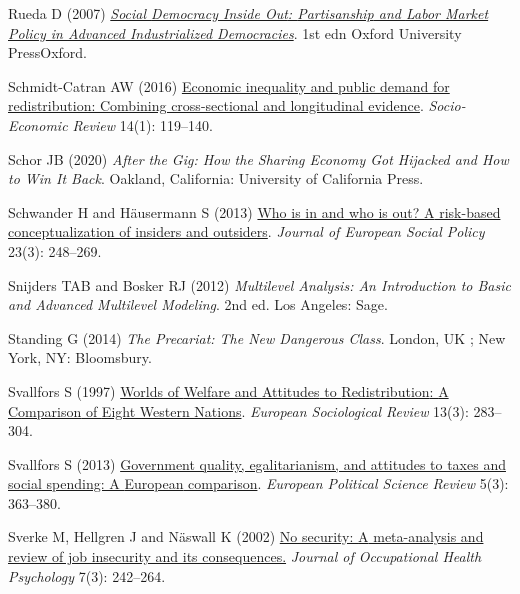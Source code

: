 \documentclass[
  12pt,
]{article}
\newlength{\cslhangindent}
\newenvironment{CSLReferences}[2] %
 {\begin{list}{}{%
  \setlength{\itemindent}{0pt}
  \setlength{\leftmargin}{0pt}
  \setlength{\parsep}{0pt}
  \ifodd #1
   \setlength{\leftmargin}{\cslhangindent}
   \setlength{\itemindent}{-1\cslhangindent}
  \fi
  \setlength{\itemsep}{#2\baselineskip}}}
 {\end{list}}
\begin{document}
\begin{CSLReferences}{1}{1}
Rueda D (2007)
\emph{\href{https://doi.org/10.1093/acprof:oso/9780199216352.001.0001}{Social
{Democracy Inside Out}: {Partisanship} and {Labor Market Policy} in
{Advanced Industrialized Democracies}}}. 1st edn Oxford University
PressOxford.

Schmidt-Catran AW (2016)
\href{https://doi.org/10.1093/ser/mwu030}{Economic inequality and public
demand for redistribution: Combining cross-sectional and longitudinal
evidence}. \emph{Socio-Economic Review} 14(1): 119--140.

Schor JB (2020) \emph{After the Gig: How the Sharing Economy Got
Hijacked and How to Win It Back}. Oakland, California: University of
California Press.

Schwander H and Häusermann S (2013)
\href{https://doi.org/10.1177/0958928713480064}{Who is in and who is
out? {A} risk-based conceptualization of insiders and outsiders}.
\emph{Journal of European Social Policy} 23(3): 248--269.

Snijders TAB and Bosker RJ (2012) \emph{Multilevel Analysis: An
Introduction to Basic and Advanced Multilevel Modeling}. 2nd ed. Los
Angeles: Sage.

Standing G (2014) \emph{The Precariat: The New Dangerous Class}. London,
UK ; New York, NY: Bloomsbury.

Svallfors S (1997)
\href{https://doi.org/10.1093/oxfordjournals.esr.a018219}{Worlds of
{Welfare} and {Attitudes} to {Redistribution}: {A Comparison} of {Eight
Western Nations}}. \emph{European Sociological Review} 13(3): 283--304.

Svallfors S (2013)
\href{https://doi.org/10.1017/S175577391200015X}{Government quality,
egalitarianism, and attitudes to taxes and social spending: A {European}
comparison}. \emph{European Political Science Review} 5(3): 363--380.

Sverke M, Hellgren J and Näswall K (2002)
\href{https://doi.org/10.1037/1076-8998.7.3.242}{No security: {A}
meta-analysis and review of job insecurity and its consequences.}
\emph{Journal of Occupational Health Psychology} 7(3): 242--264.


\end{CSLReferences}
\end{document}
